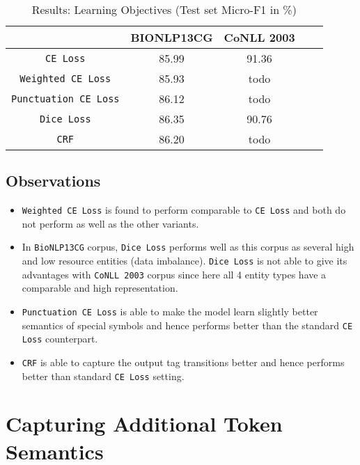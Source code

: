 \begin{table}[h!]
\centering
\begin{tabular}{|c|c|c|c|c|}\hline
	\textbf{} & \textbf{BIONLP13CG} & \textbf{CoNLL 2003}\\\hline
	\texttt{CE Loss} & 85.99 & 91.36\\\hline
	\texttt{Weighted CE Loss} & 85.93 & todo\\\hline
	\texttt{Punctuation CE Loss} & 86.12 & todo\\\hline
	\texttt{Dice Loss} & 86.35 & 90.76\\\hline
	\texttt{CRF} & 86.20 & todo\\\hline
	\end{tabular}
    \caption{Results: Learning Objectives (Test set Micro-F1 in \%)}
    \label{tab:res_loss}
\end{table}

\subsection{Observations}
\begin{itemize}
    \item \texttt{Weighted CE Loss} is found to perform comparable to \texttt{CE Loss} and both do not perform as well as the other variants.
    
    \item In \texttt{BioNLP13CG} corpus, \texttt{Dice Loss} performs well as this corpus as several high and low resource entities (data imbalance). \texttt{Dice Loss} is not able to give its advantages with \texttt{CoNLL 2003} corpus since here all 4 entity types have a comparable and high representation.
    
    \item \texttt{Punctuation CE Loss} is able to make the model learn slightly better semantics of special symbols and hence performs better than the standard \texttt{CE Loss} counterpart.
    
    \item \texttt{CRF} is able to capture the output tag transitions better and hence performs better than standard \texttt{CE Loss} setting.
\end{itemize}

\section{Capturing Additional Token Semantics}
\label{sec:additional_token_semantics}

